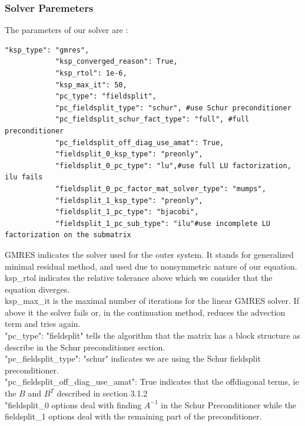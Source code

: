 \documentclass[11pt,twoside,a4paper]{article}
\begin{document}
\subsubsection{Solver Paremeters}
The parameters of our solver are :
\begin{lstlisting}
"ksp_type": "gmres",
            "ksp_converged_reason": True,
            "ksp_rtol": 1e-6,
            "ksp_max_it": 50,
            "pc_type": "fieldsplit",
            "pc_fieldsplit_type": "schur", #use Schur preconditioner
            "pc_fieldsplit_schur_fact_type": "full", #full preconditioner
            "pc_fieldsplit_off_diag_use_amat": True,
            "fieldsplit_0_ksp_type": "preonly",
            "fieldsplit_0_pc_type": "lu",#use full LU factorization, ilu fails
            "fieldsplit_0_pc_factor_mat_solver_type": "mumps",
            "fieldsplit_1_ksp_type": "preonly",
            "fieldsplit_1_pc_type": "bjacobi",
            "fieldsplit_1_pc_sub_type": "ilu"#use incomplete LU factorization on the submatrix
\end{lstlisting}
GMRES indicates the solver used for the outer system.
 It stands for generalized minimal residual method, and used due to nonsymmetric nature of our equation.\\
ksp\_rtol indicates the relative tolerance above which we consider that the equation diverges.\\
ksp\_max\_it is the maximal number of iterations for the linear GMRES solver. If above it the solver fails or, in the continuation method, reduces the advection term and tries again.\\
"pc\_type": "fieldsplit" tells the algorithm that the matrix has a block structure as describe in the Schur preconditioner section.\\
"pc\_fieldsplit\_type": "schur" indicates we are using the Schur fieldsplit preconditioner.\\
"pc\_fieldsplit\_off\_diag\_use\_amat": True indicates that the offdiagonal terms, ie the $B$ and $B^T$ described in section 3.1.2 \\
"fieldsplit\_0 options deal with finding $A^{-1}$ in the Schur Preconditioner while the fieldsplit\_1 options deal with the remaining part of the preconditioner.\\
\end{document}
